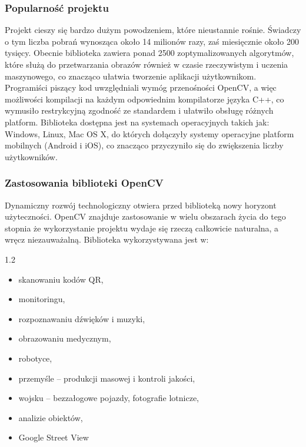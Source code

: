 \documentclass[a4paper,12pt]{article}
\newcommand\spacingInSolemnItemize{1.2}
\newcommand\spacingIndent{2.2em}
\begin{document}
		\subsubsection{Popularność projektu}  
			\hspace{\spacingIndent} Projekt cieszy się bardzo dużym powodzeniem, które nieustannie rośnie. Świadczy o tym liczba pobrań 
				wynosząca około 14 milionów razy, zaś miesięcznie około 200 tysięcy. Obecnie biblioteka zawiera ponad 2500 zoptymalizowanych algorytmów, 
				które służą do przetwarzania obrazów również w czasie rzeczywistym i uczenia maszynowego, co znacząco ułatwia tworzenie aplikacji użytkownikom. 
				Programiści piszący kod uwzględniali wymóg przenośności OpenCV, a więc możliwości kompilacji na każdym odpowiednim kompilatorze języka C++, 
				co wymusiło restrykcyjną zgodność ze standardem i ułatwiło obsługę różnych platform. Biblioteka dostępna jest na systemach operacyjnych takich jak: 
				Windows, Linux, Mac OS X, do których dołączyły systemy operacyjne platform mobilnych (Android i iOS), co znacząco przyczyniło się do zwiększenia liczby użytkowników.

		\subsubsection{Zastosowania biblioteki OpenCV}
			\hspace{\spacingIndent} Dynamiczny rozwój technologiczny otwiera przed biblioteką nowy horyzont użyteczności. 
				OpenCV znajduje zastosowanie w wielu obszarach życia do tego stopnia że wykorzystanie projektu wydaje się rzeczą całkowicie naturalna,
				a wręcz niezauważalną. Biblioteka wykorzystywana jest w:
			
			    \begin{spacing}{\spacingInSolemnItemize}
			        \begin{itemize}
        				\item skanowaniu kodów QR,
        				\item monitoringu,
        				\item rozpoznawaniu dźwięków i muzyki,
        				\item obrazowaniu medycznym,
        				\item robotyce,	
        				\item przemyśle -- produkcji masowej i kontroli jakości,
        				\item wojsku -- bezzałogowe pojazdy, fotografie lotnicze,
				        \item analizie obiektów,
				        \item Google Street View
		            \end{itemize}
                \end{spacing}
    
\end{document}
